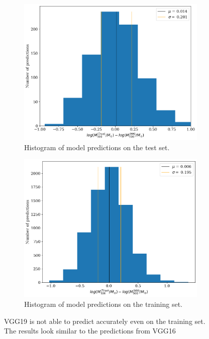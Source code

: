 \begin{figure}[H]
\begin{subfigure}{.46\textwidth}
  \centering
  \includegraphics[width=\linewidth]{images/Chapter4/VGG19/vgg19_test_hist.png}
  \caption{Histogram of model predictions on the test set.}
  \label{fig:best_perf_vgg19_c}
\end{subfigure}%
\hspace{.6em}
\begin{subfigure}{.46\textwidth}
  \centering
  \includegraphics[width=\linewidth]{images/Chapter4/VGG19/vgg19_train_hist.png}
  \caption{Histogram of model predictions on the training set.}
  \label{fig:best_perf_vgg19_d}
\end{subfigure}
\caption{VGG19 is not able to predict accurately even on the training set. The results look similar to the predictions from VGG16} 
\label{fig:best_perf_vgg19}
\end{figure}

